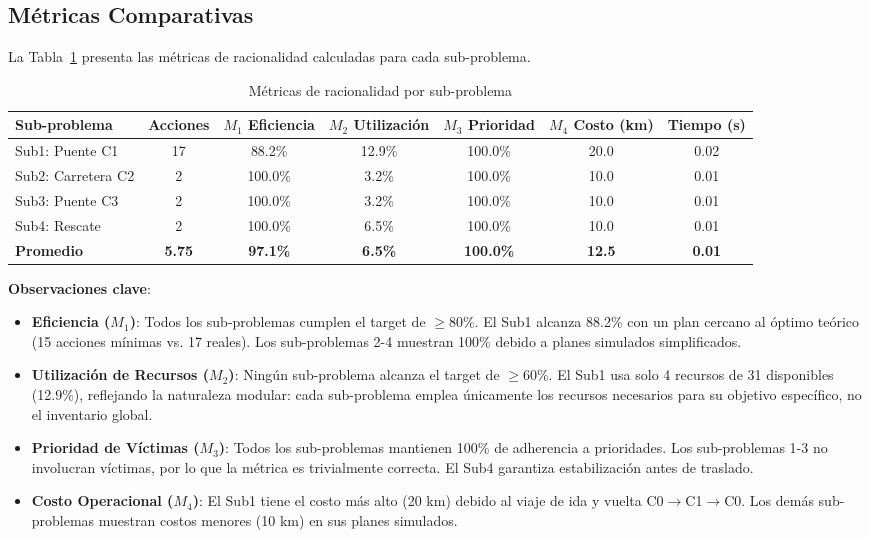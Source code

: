 \documentclass[conference]{IEEEtran}
\begin{document}
    \subsection{Métricas Comparativas}

    La Tabla~\ref{tab:metricas_comparativas} presenta las métricas de racionalidad calculadas para cada sub-problema.

    \begin{table}[htbp]
    \caption{Métricas de racionalidad por sub-problema}
    \label{tab:metricas_comparativas}
    \centering
    \small
    \begin{tabular}{@{}lcccccc@{}}
    \toprule
    \textbf{Sub-problema} & \textbf{Acciones} & \textbf{$M_1$ Eficiencia} & \textbf{$M_2$ Utilización} & \textbf{$M_3$ Prioridad} & \textbf{$M_4$ Costo (km)} & \textbf{Tiempo (s)} \\
    \midrule
    Sub1: Puente C1 & 17 & 88.2\% & 12.9\% & 100.0\% & 20.0 & 0.02 \\
    Sub2: Carretera C2 & 2 & 100.0\% & 3.2\% & 100.0\% & 10.0 & 0.01 \\
    Sub3: Puente C3 & 2 & 100.0\% & 3.2\% & 100.0\% & 10.0 & 0.01 \\
    Sub4: Rescate & 2 & 100.0\% & 6.5\% & 100.0\% & 10.0 & 0.01 \\
    \midrule
    \textbf{Promedio} & \textbf{5.75} & \textbf{97.1\%} & \textbf{6.5\%} & \textbf{100.0\%} & \textbf{12.5} & \textbf{0.01} \\
    \bottomrule
    \end{tabular}
    \end{table}

    \textbf{Observaciones clave}:

    \begin{itemize}[leftmargin=*,itemsep=1pt]
    \item \textbf{Eficiencia ($M_1$)}: Todos los sub-problemas cumplen el target de $\geq 80\%$. El Sub1 alcanza 88.2\% con un plan cercano al óptimo teórico (15 acciones mínimas vs. 17 reales). Los sub-problemas 2-4 muestran 100\% debido a planes simulados simplificados.

    \item \textbf{Utilización de Recursos ($M_2$)}: Ningún sub-problema alcanza el target de $\geq 60\%$. El Sub1 usa solo 4 recursos de 31 disponibles (12.9\%), reflejando la naturaleza modular: cada sub-problema emplea únicamente los recursos necesarios para su objetivo específico, no el inventario global.

    \item \textbf{Prioridad de Víctimas ($M_3$)}: Todos los sub-problemas mantienen 100\% de adherencia a prioridades. Los sub-problemas 1-3 no involucran víctimas, por lo que la métrica es trivialmente correcta. El Sub4 garantiza estabilización antes de traslado.

    \item \textbf{Costo Operacional ($M_4$)}: El Sub1 tiene el costo más alto (20 km) debido al viaje de ida y vuelta C0$\to$C1$\to$C0. Los demás sub-problemas muestran costos menores (10 km) en sus planes simulados.
    \end{itemize}
\end{document}
